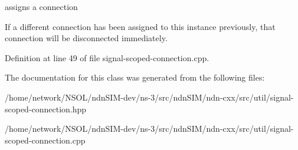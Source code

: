 assigns a connection 

If a different connection has been assigned to this instance previously, that connection will be disconnected immediately. 

Definition at line 49 of file signal-\/scoped-\/connection.\+cpp.



The documentation for this class was generated from the following files\+:\begin{DoxyCompactItemize}
\item 
/home/network/\+N\+S\+O\+L/ndn\+S\+I\+M-\/dev/ns-\/3/src/ndn\+S\+I\+M/ndn-\/cxx/src/util/signal-\/scoped-\/connection.\+hpp\item 
/home/network/\+N\+S\+O\+L/ndn\+S\+I\+M-\/dev/ns-\/3/src/ndn\+S\+I\+M/ndn-\/cxx/src/util/signal-\/scoped-\/connection.\+cpp\end{DoxyCompactItemize}
